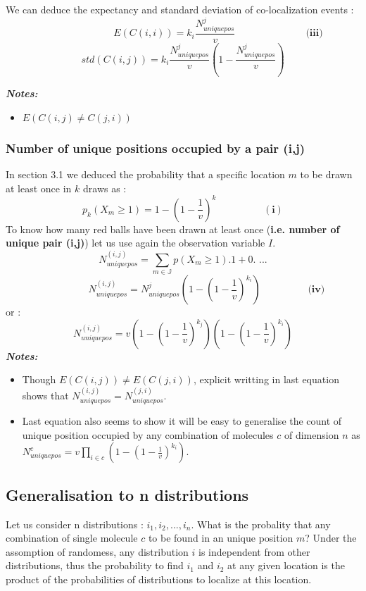 \documentclass{article}  %
\begin{document}
We can deduce the expectancy and standard deviation of co-localization events :
\[
    \hspace{3cm}E(C(i,i)) = k_i\frac{N^j_{uniquepos}}{v} \hspace{3cm} \textbf{(iii)}
\]
\[
std(C(i,j)) = k_i\frac{N^j_{uniquepos}}{v}(1-\frac{N^j_{uniquepos}}{v})
\]

\textit{\textbf{Notes:}}
\begin{itemize}
    \item $E(C(i,j) \neq C(j,i))$
\end{itemize}

\subsubsection{Number of unique positions occupied by a pair (i,j)}
In section 3.1 we deduced the probability that a specific location $m$ to be drawn at least once  in $k$ draws as :
\[
p_k(X_m \geq 1) = 1-(1 - \frac{1}{v})^k \hspace{2cm} (\textbf{i})
\]
To know how many red balls have been drawn at least once (\textbf{i.e. number of unique pair (i,j)}) let us use again the observation
variable $I$.
\[
N^{(i,j)}_{uniquepos} = \sum_{m \in \mathbb{J}}p(X_m \geq 1).1 + 0. \textbf{ ...}
\]
\[
\hspace{2cm} N^{(i,j)}_{uniquepos} = N^j_{uniquepos}(1-(1-\frac{1}{v})^{k_i}) \hspace{2cm} \textbf{(iv)}
\]
or :
\[
N^{(i,j)}_{uniquepos} = v(1-(1-\frac{1}{v})^{k_j})(1-(1-\frac{1}{v})^{k_i})
\]
\textit{\textbf{Notes:}}
\begin{itemize}
    \item Though $E(C(i,j)) \neq E(C(j,i))$, explicit writting in last equation shows that $N^{(i,j)}_{uniquepos} = N^{(j,i)}_{uniquepos}$.
    \item Last equation also seems to show it will be easy to generalise the count of unique position occupied by any combination of molecules $c$ of dimension $n$
    as $N^c_{uniquepos} = v\prod_{i \in c}(1-(1-\frac{1}{v})^{k_i})$.
\end{itemize}

\subsection{Generalisation to n distributions}

Let us consider n distributions : $i_1, i_2, ..., i_n$. What is the probality that any combination of single molecule $c$ to be found in an unique position $m$?
Under the assomption of randomess, any distribution $i$ is independent from other distributions, thus the probability to find $i_1$ and $i_2$ at any given
location is the product of the probabilities of distributions to localize at this location.
\end{document}
